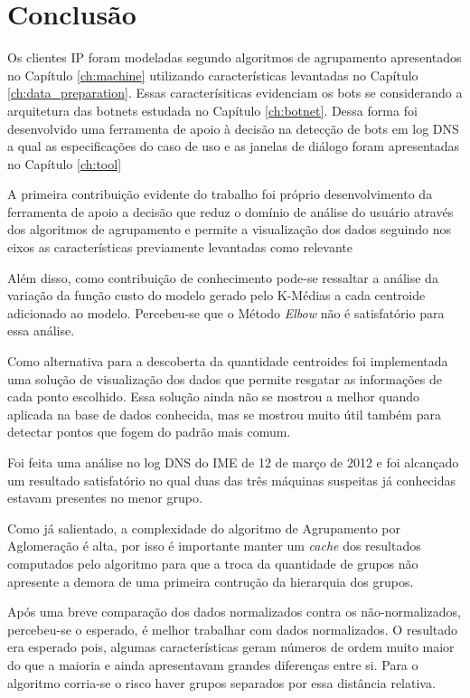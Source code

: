 \chapter{Conclusão}

Os clientes IP foram modeladas segundo algoritmos de agrupamento apresentados no Capítulo \ref{ch:machine} utilizando características levantadas no Capítulo \ref{ch:data_preparation}. Essas caracterísiticas evidenciam os bots se considerando a arquitetura das botnets estudada no Capítulo \ref{ch:botnet}. Dessa forma foi desenvolvido uma ferramenta de apoio à decisão na detecção de bots em log DNS a qual as especificações do caso de uso e as janelas de diálogo foram apresentadas no Capítulo \ref{ch:tool}

A primeira contribuição evidente do trabalho foi próprio desenvolvimento da ferramenta de apoio a decisão que reduz o domínio de análise do usuário através dos algoritmos de agrupamento e permite a visualização dos dados seguindo nos eixos as características previamente levantadas como relevante

Além disso, como contribuição de conhecimento pode-se ressaltar a análise da variação da função custo do modelo gerado pelo K-Médias a cada centroide adicionado ao modelo. Percebeu-se que o Método \textit{Elbow} não é satisfatório para essa análise.

Como alternativa para a descoberta da quantidade centroides foi implementada uma solução de visualização dos dados que permite resgatar as informações de cada ponto escolhido. Essa solução ainda não se mostrou a melhor quando aplicada na base de dados conhecida, mas se mostrou muito útil também para detectar pontos que fogem do padrão mais comum.

Foi feita uma análise no log DNS do IME de 12 de março de 2012 e foi alcançado um resultado satisfatório no qual duas das três máquinas suspeitas já conhecidas estavam presentes no menor grupo.

Como já salientado, a complexidade do algoritmo de Agrupamento por Aglomeração é alta, por isso é importante manter um \textit{cache} dos resultados computados pelo algoritmo para que a troca da quantidade de grupos não apresente a demora de uma primeira contrução da hierarquia dos grupos.

Após uma breve comparação dos dados normalizados contra os não-normalizados, percebeu-se o esperado, é melhor trabalhar com dados normalizados. O resultado era esperado pois, algumas características geram números de ordem muito maior do que a maioria e ainda apresentavam grandes diferenças entre si. Para o algoritmo corria-se o risco haver grupos separados por essa distância relativa.

